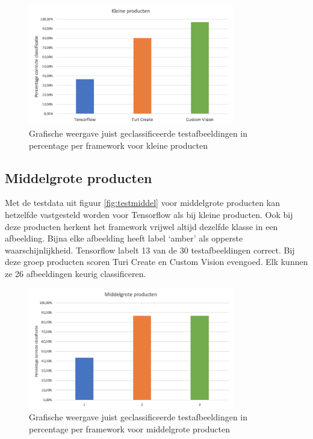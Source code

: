 \begin{figure}[ht!]
  \centering
      \includegraphics[width=0.8\textwidth]{img/grafiekkleineproducten.png}
  \caption{Grafische weergave juist geclassificeerde testafbeeldingen in percentage per framework voor kleine producten}
  \label{fig:grafiekkleineproducten}
\end{figure}

\subsection{Middelgrote producten}
\label{ssec:Middelgrote producten}

Met de testdata uit figuur \ref{fig:testmiddel} voor middelgrote producten kan hetzelfde vastgesteld worden voor Tensorflow als bij kleine producten.  Ook bij deze producten herkent het framework vrijwel altijd dezelfde klasse in een afbeelding. Bijna elke afbeelding heeft label ‘amber’ als opperste waarschijnlijkheid. Tensorflow labelt 13 van de 30 testafbeeldingen correct. Bij deze groep producten scoren Turi Create en Custom Vision evengoed. Elk kunnen ze 26 afbeeldingen keurig classificeren. 

\begin{figure}[ht!]
  \centering
      \includegraphics[width=0.8\textwidth]{img/grafiekmiddelproducten.png}
  \caption{Grafische weergave juist geclassificeerde testafbeeldingen in percentage per framework voor middelgrote producten}
  \label{fig:grafiekmiddelproducten}
\end{figure}

